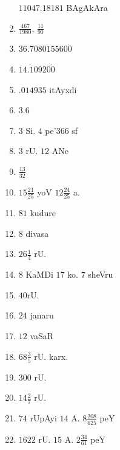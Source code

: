 \begin{multicols}{2}
\begin{enumerate}[$(1)$]
      $11047.18181$ BAgAkAra
\item $\frac{467}{1980}$, $\frac{11}{90}$
\item $36.7080\dot{1}5 56 0\dot{0}$
\item $14.\dot{1}0920\dot{0}$
\item $.014935$ itAyxdi
\item $3.6$
\item $3$ Si. $4$ pe\char'366 sf
\item $3$ rU. $12$ ANe
\item $\frac{13}{32}$ 
\item $15 \frac{21}{25}$ yoV $12 \frac{24}{25}$ a.
\item $81$ kudure
\item $8$ divasa
\item $26 \frac{1}{4}$ rU.
\item $8$ KaMDi $17$ ko. $7$ sheVru
\item $40$rU.
\item $24$ janaru
\item $12$ vaSaR
\item $68\frac{3}{5}$ rU. karx.
\item $300$ rU.
\item $14\frac{2}{7}$ rU. 
\item $74$ rUpAyi $14$ A. $8 \frac{208}{625}$ peY
\item $1622$ rU. $15$ A. $2\frac{34}{61}$ peY 


\end{enumerate}
\end{multicols}

